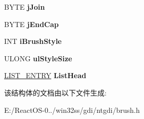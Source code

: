 \begin{DoxyCompactItemize}
B\+Y\+TE {\bfseries j\+Join}
\item 
\mbox{\label{struct___b_r_u_s_h_b_o_d_y_a626267d2c08e9962d88f08d24f7368f1}} 
B\+Y\+TE {\bfseries j\+End\+Cap}
\item 
\mbox{\label{struct___b_r_u_s_h_b_o_d_y_a19e9e354c603913cd6cbcbb503b9db64}} 
I\+NT {\bfseries i\+Brush\+Style}
\item 
\mbox{\label{struct___b_r_u_s_h_b_o_d_y_a219c2c4e41c095f3d835b0b2a7908f3c}} 
U\+L\+O\+NG {\bfseries ul\+Style\+Size}
\item 
\mbox{\label{struct___b_r_u_s_h_b_o_d_y_a1b7a86101e869369efef749db0c182c1}} 
\hyperlink{struct___l_i_s_t___e_n_t_r_y}{L\+I\+S\+T\+\_\+\+E\+N\+T\+RY} {\bfseries List\+Head}
\end{DoxyCompactItemize}


该结构体的文档由以下文件生成\+:\begin{DoxyCompactItemize}
\item 
E\+:/\+React\+O\+S-\/0../win32ss/gdi/ntgdi/brush.\+h\end{DoxyCompactItemize}
